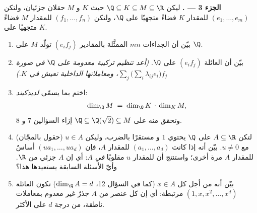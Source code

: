 \begin{problem}
\medskip
\noindent\textbf{الجزء 3 --- .} ليكن $\Q \subseteq K
\subseteq M \subseteq \R$ حيث $K$ و $M$ حقلان جزئيان، ولتكن $(e_1,
\dots, e_m)$  للمقدار $K$ فضاءً متجهيًا على $\Q$، ولتكن $(f_1,
\dots, f_n)$  للمقدار $M$ فضاءً متجهيًا على $K$.
\begin{enumerate}[resume]
  \item بيّن أن الجداءات $mn$ الممثَّلة بالمقادير $(e_i f_j)$ تولّد $M$ على
        $\Q$.
  \item بيّن أن العائلة $(e_i f_j)$  على $\Q$.
        \emph{(أعد تنظيم تركيبة معدومة على $\Q$ في صورة $\sum_j
        \bigl(\sum_i \lambda_{ij} e_i\bigr) f_j$، ومعاملاتها
        الداخلية تعيش في $K$.)}
  \item اختم بما يسمّى \emph{ لديدكيند}:
        \[
        \dim_\Q M \;=\; \dim_\Q K \,\cdot\, \dim_K M ,
        \]
        وتحقق منه على $\Q \subseteq \Q(\sqrt2) \subseteq M$
        إزاء السؤالين 7 و 8.
  \item (حقول بالمجّان) لتكن $A \subseteq \R$ 
        على $\Q$  يحتوي $1$ و
        مستقرًا بالضرب، وليكن $u \in A$ مع $u \neq
        0$. بيّن أنه إذا كانت $(a_1, \dots, a_d)$  للمقدار $A$،
        فإن $(u a_1, \dots, u a_d)$ أساسٌ للمقدار $A$ مرة أخرى؛
        واستنتج أن للمقدار $u$ مقلوبًا \emph{في $A$}: أي إن $A$
         جزئي من $\R$. وأيّ الأسئلة السابقة يستعيدها هذا؟
  \item بيّن أنه من أجل كل $x \in A$ (كما في السؤال 12، $\dim_\Q
        A = d$) تكون العائلة $(1, x, x^2, \dots, x^{d})$ مرتبطة:
        أي إن كل عنصر من $A$ جذرٌ  غير معدوم
        بمعاملات ناطقة، من درجة $d$ على الأكثر.
\end{enumerate}


\end{problem}
